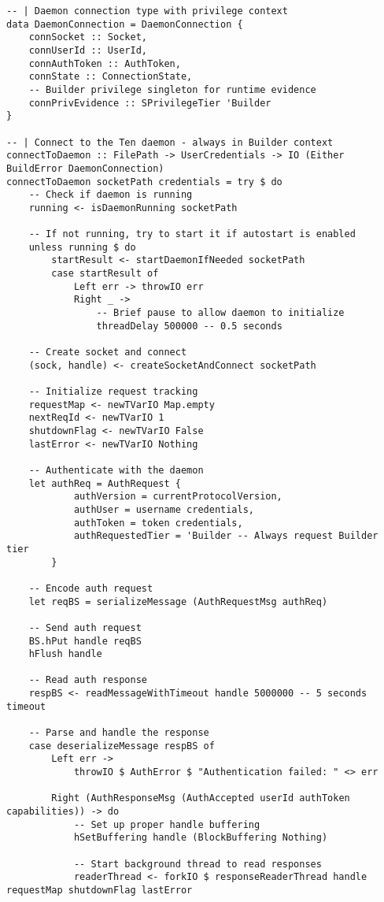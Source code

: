 \documentclass{article}
\begin{document}
\begin{tcolorbox}[title=Ten/Daemon/Client.hs Changes]
\begin{verbatim}
-- | Daemon connection type with privilege context
data DaemonConnection = DaemonConnection {
    connSocket :: Socket,
    connUserId :: UserId,
    connAuthToken :: AuthToken,
    connState :: ConnectionState,
    -- Builder privilege singleton for runtime evidence
    connPrivEvidence :: SPrivilegeTier 'Builder
}

-- | Connect to the Ten daemon - always in Builder context
connectToDaemon :: FilePath -> UserCredentials -> IO (Either BuildError DaemonConnection)
connectToDaemon socketPath credentials = try $ do
    -- Check if daemon is running
    running <- isDaemonRunning socketPath

    -- If not running, try to start it if autostart is enabled
    unless running $ do
        startResult <- startDaemonIfNeeded socketPath
        case startResult of
            Left err -> throwIO err
            Right _ ->
                -- Brief pause to allow daemon to initialize
                threadDelay 500000 -- 0.5 seconds

    -- Create socket and connect
    (sock, handle) <- createSocketAndConnect socketPath

    -- Initialize request tracking
    requestMap <- newTVarIO Map.empty
    nextReqId <- newTVarIO 1
    shutdownFlag <- newTVarIO False
    lastError <- newTVarIO Nothing

    -- Authenticate with the daemon
    let authReq = AuthRequest {
            authVersion = currentProtocolVersion,
            authUser = username credentials,
            authToken = token credentials,
            authRequestedTier = 'Builder -- Always request Builder tier
        }

    -- Encode auth request
    let reqBS = serializeMessage (AuthRequestMsg authReq)

    -- Send auth request
    BS.hPut handle reqBS
    hFlush handle

    -- Read auth response
    respBS <- readMessageWithTimeout handle 5000000 -- 5 seconds timeout

    -- Parse and handle the response
    case deserializeMessage respBS of
        Left err ->
            throwIO $ AuthError $ "Authentication failed: " <> err

        Right (AuthResponseMsg (AuthAccepted userId authToken capabilities)) -> do
            -- Set up proper handle buffering
            hSetBuffering handle (BlockBuffering Nothing)

            -- Start background thread to read responses
            readerThread <- forkIO $ responseReaderThread handle requestMap shutdownFlag lastError


\end{verbatim}
\end{tcolorbox}
\end{document}
